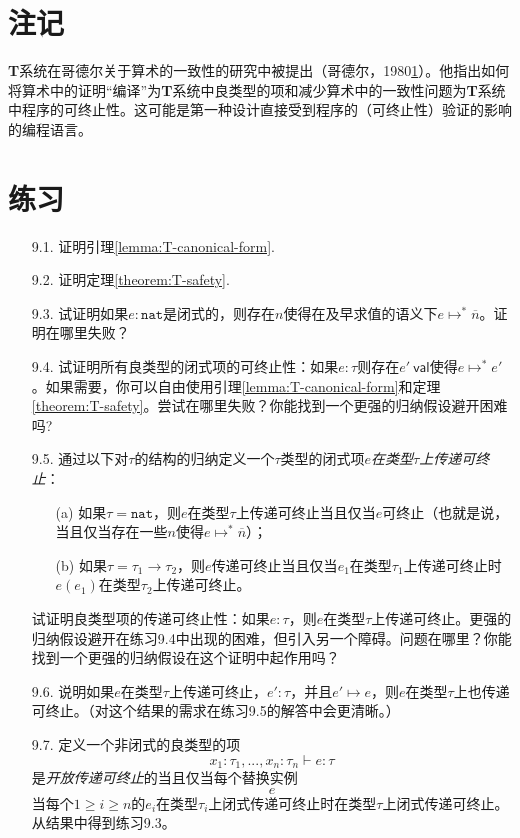 \section{注记}

\textbf{T}系统在哥德尔关于算术的一致性的研究中被提出（哥德尔，1980\ref{}）。他指出如何将算术中的证明“编译”为\textbf{T}系统中良类型的项和减少算术中的一致性问题为\textbf{T}系统中程序的可终止性。这可能是第一种设计直接受到程序的（可终止性）验证的影响的编程语言。

\section*{练习}

\begin{itemize}
\item[9.1.] 证明引理\ref{lemma:T-canonical-form}.
\item[9.2.] 证明定理\ref{theorem:T-safety}.
\item[9.3.] 试证明如果$e:\mathtt{nat}$是闭式的，则存在$n$使得在及早求值的语义下$e\longmapsto^*\overline{n}$。证明在哪里失败？
\item[9.4.] 试证明所有良类型的闭式项的可终止性：如果$e:\tau$则存在$e'\ \mathsf{val}$使得$e\longmapsto^*e'$。如果需要，你可以自由使用引理\ref{lemma:T-canonical-form}和定理\ref{theorem:T-safety}。尝试在哪里失败？你能找到一个更强的归纳假设避开困难吗?
\item[9.5.] 通过以下对$\tau$的结构的归纳定义一个$\tau$类型的闭式项$e$\textit{在类型$\tau$上传递可终止}：
\begin{itemize}
\item[(a)] 如果$\tau=\mathtt{nat}$，则$e$在类型$\tau$上传递可终止当且仅当$e$可终止（也就是说，当且仅当存在一些$n$使得$e\longmapsto^*\overline{n}$）；
\item[(b)] 如果$\tau=\tau_1\to\tau_2$，则$e$传递可终止当且仅当$e_1$在类型$\tau_1$上传递可终止时$e(e_1)$在类型$\tau_2$上传递可终止。
\end{itemize}
试证明良类型项的传递可终止性：如果$e:\tau$，则$e$在类型$\tau$上传递可终止。更强的归纳假设避开在练习9.4中出现的困难，但引入另一个障碍。问题在哪里？你能找到一个更强的归纳假设在这个证明中起作用吗？
\item[9.6.] 说明如果$e$在类型$\tau$上传递可终止，$e':\tau$，并且$e'\longmapsto e$，则$e$在类型$\tau$上也传递可终止。（对这个结果的需求在练习9.5的解答中会更清晰。）
\item[9.7.] 定义一个非闭式的良类型的项
\begin{equation*}
x_1:\tau_1,...,x_n:\tau_n\vdash e:\tau
\end{equation*}
是\textit{开放传递可终止}的当且仅当每个替换实例
\begin{equation*}
[e_1,...,e_n/x_1,...,x_n]e
\end{equation*}
当每个$1\ge i\ge n$的$e_i$在类型$\tau_i$上闭式传递可终止时在类型$\tau$上闭式传递可终止。从结果中得到练习9.3。
\end{itemize}
